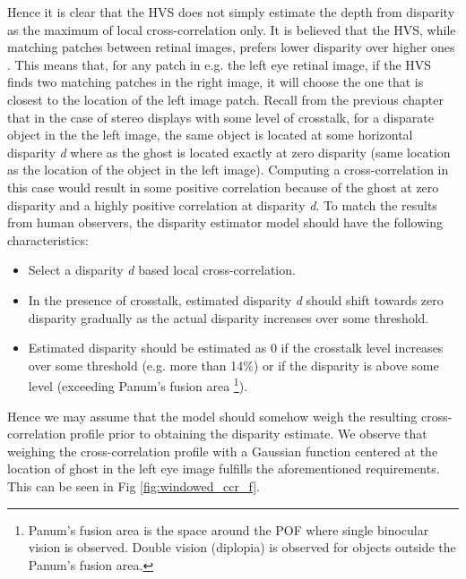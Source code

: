 Hence it is clear that the HVS does not simply estimate the depth from disparity as the maximum of local cross-correlation only. It is believed that the HVS, while matching patches between retinal images, prefers lower disparity over higher ones \cite{howard1995binocular}. This means that, for any patch in e.g. the left eye retinal image, if the HVS finds two matching patches in the right image, it will choose the one that is closest to the location of the left image patch. Recall from the previous chapter that in the case of stereo displays with some level of crosstalk, for a disparate object in the the left image, the same object is located at some horizontal disparity \emph{d} where as the ghost is located exactly at zero disparity (same location as the location of the object in the left image). Computing a cross-correlation in this case would result in some positive correlation because of the ghost at zero disparity and a highly positive correlation at disparity \emph{d}. To match the results from human observers, the disparity estimator model should have the following characteristics:
\begin{itemize}
\item{Select a disparity \emph{d} based local cross-correlation.}
\item{In the presence of crosstalk, estimated disparity \emph{d} should shift towards zero disparity gradually as the actual disparity increases over some threshold.}
\item{Estimated disparity should be estimated as 0 if the crosstalk level increases over some threshold (e.g. more than 14\%) or if the disparity is above some level (exceeding Panum's fusion area \footnote{Panum's fusion area is the space around the POF where single binocular vision is observed. Double vision (diplopia) is observed for objects outside the Panum's fusion area.}).}
\end{itemize}
Hence we may assume that the model should somehow weigh the resulting cross-correlation profile prior to obtaining the disparity estimate. We observe that weighing the cross-correlation profile with a Gaussian function centered at the location of ghost in the left eye image fulfills the aforementioned requirements. This can be seen in Fig \ref{fig:windowed_ccr_f}.

